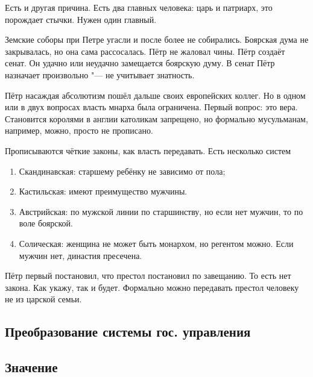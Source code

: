 Есть и другая причина. Есть два главных человека: царь и патриарх, это порождает стычки. Нужен один главный.

Земские соборы при Петре угасли и после более не собирались. Боярская дума не закрывалась, но она сама рассосалась. Пётр не жаловал чины. Пётр создаёт сенат. Он удачно или неудачно замещается боярскую думу. В сенат Пётр назначает произвольно "--- не учитывает знатность.

Пётр насаждая абсолютизм пошёл дальше своих европейских коллег. Но в одном или в двух вопросах власть мнарха была ограничена. Первый вопрос: это вера. Становится королями в англии католикам запрещено, но формально мусульманам, например, можно, просто не прописано.

Прописываются чёткие законы, как власть передавать. Есть несколько систем
\begin{enumerate}
\item Скандинавская: старшему ребёнку не зависимо от пола;
\item Кастильская: имеют преимущество мужчины.
\item Австрийская: по мужской линии по старшинству, но если нет мужчин, то по воле боярской.
\item Солическая: женщина не может быть монархом, но регентом можно. Если мужчин нет, династия пресечена. 
\end{enumerate}

Пётр первый постановил, что престол постановил по завещанию. То есть нет закона. Как укажу, так и будет. Формально можно передавать престол человеку не из царской семьи.
\subsection{Преобразование системы гос. управления}
\subsection{Значение}
